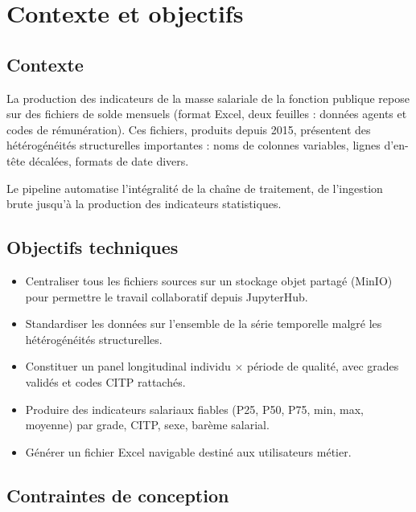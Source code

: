 \documentclass[12pt,a4paper,french]{report}
\begin{document}
\chapter{Contexte et objectifs}

\section{Contexte}

La production des indicateurs de la masse salariale de la fonction publique
repose sur des fichiers de solde mensuels (format Excel, deux feuilles :
données agents et codes de rémunération). Ces fichiers, produits depuis 2015,
présentent des hétérogénéités structurelles importantes : noms de colonnes
variables, lignes d'en-tête décalées, formats de date divers.

Le pipeline automatise l'intégralité de la chaîne de traitement, de
l'ingestion brute jusqu'à la production des indicateurs statistiques.

\section{Objectifs techniques}

\begin{itemize}
  \item Centraliser tous les fichiers sources sur un stockage objet partagé
        (MinIO) pour permettre le travail collaboratif depuis JupyterHub.
  \item Standardiser les données sur l'ensemble de la série temporelle malgré
        les hétérogénéités structurelles.
  \item Constituer un panel longitudinal individu $\times$ période de qualité,
        avec grades validés et codes CITP rattachés.
  \item Produire des indicateurs salariaux fiables (P25, P50, P75, min, max,
        moyenne) par grade, CITP, sexe, barème salarial.
  \item Générer un fichier Excel navigable destiné aux utilisateurs métier.
\end{itemize}

\section{Contraintes de conception}
\end{document}
